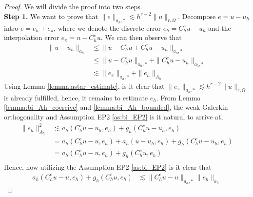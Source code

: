 \begin{proof}
    We will divide the proof into two steps.
    \\
        \textbf{Step 1.} We want to prove that $\| e \|_{ a_{h},* }^{  } \lesssim   h^{r-2} \| u \|_{ r,\Omega  }^{  }$.
    Decompose $e = u - u_{h}$ intro $e = e_{h} + e_{\pi }$, where we denote the discrete error $e_{h} = C _{h}^{e} u - u_{h}$ and the interpolation error $e_{\pi } = u - C _{h} ^{e}u$. We can then observe that
    \begin{equation}
        \begin{split}
    \| u - u_{h} \|_{ a_{h} }^{  } & \le   \| u - C_{h}^{e} u + C_{h}^{e}u - u_{h} \|_{ a_{h},* }^{  } \\
    & \le \|  u - C_{h}^{e} u \|_{a_{h},*  }^{  } +  \| C_{h}^{e}u - u_{h} \|_{a_{h},*  }^{  }\\
                                     & \lesssim  \| e_{\pi } \|_{a_{h},*}^{  } + \| e_{h} \|_{A_{h}  }^{  }
        \end{split}
    \end{equation}
    Using Lemma \ref{lemma:astar_estimate}, is it clear that $\| e_{\pi } \|_{a_{h},*}^{  } \lesssim h^{r-2} \| u \|_{ r,\Omega  }^{  }  $ is already fulfilled, hence, it remains to estimate $e_{h}$. From Lemma \ref{lemma:bi_Ah_coercive} and
    \ref{lemma:bi_Ah_bounded}, the weak Galerkin orthogonality and Assumption EP2 \eqref{as:bi_EP2} is it natural to arrive at,
    \begin{equation}
        \label{eq:apriori_energy1}
    \begin{split}
\| e_{h} \|_{ A_{h} }^{ 2 } & \lesssim a_{h}( C _{h}^{e} u - u_{h}, e_{h}) + g_{h}( C _{h}^{e}u - u_{h}, e_{h}) \\
 & = a_{h}( C _{h}^{e} u - u, e_{h}) + a_{h}( u - u_{h}, e_{h}) + g_{h}( C _{h}^{e}u - u_{h}, e_{h}) \\
 & = a_{h}( C _{h}^{e} u - u, e_{h}) + g_{h}( C _{h}^{e}u, e_{h}) \\
    \end{split}
    \end{equation}
Hence, now utilizing the Assumption EP2 \eqref{as:bi_EP2} is it clear that
\begin{equation}
        \label{eq:apriori_energy2}
    \begin{split}
        a_{h}( C _{h}^{e} u - u, e_{h}) + g_{h}( C _{h}^{e}u, e_{h}) &\lesssim \| C _{h}^{e} u - u \|_{a_{h},*  }^{  } \| e_{h} \|_{a_{h}  }^{  }

\end{split}
\end{equation}
\end{proof}
